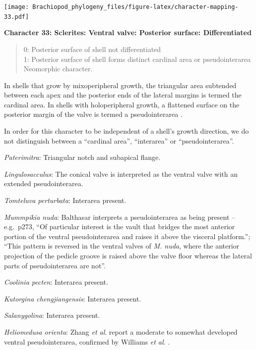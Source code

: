 \documentclass[]{book}
\theoremstyle{definition}
\theoremstyle{definition}
\theoremstyle{definition}
\theoremstyle{remark}
\begin{document}
\texttt{[image: Brachiopod\_phylogeny\_files/figure-latex/character-mapping-33.pdf]}

\textbf{Character 33: Sclerites: Ventral valve: Posterior surface:
Differentiated}

\begin{quote}
0: Posterior surface of shell not differentiated\\
1: Posterior surface of shell forms distinct cardinal area or
pseudointerarea\\
Neomorphic character.
\end{quote}

In shells that grow by mixoperipheral growth, the triangular area
subtended between each apex and the posterior ends of the lateral
margins is termed the cardinal area. In shells with holoperipheral
growth, a flattened surface on the posterior margin of the valve is
termed a pseudointerarea
\citep[paraphrasing][]{Williams1997BrachiopodaRevised}.

In order for this character to be independent of a shell's growth
direction, we do not distinguish between a ``cardinal area'',
``interarea'' or ``pseudointerarea''.

\emph{Paterimitra}: Triangular notch and subapical flange.

\emph{Lingulosacculus}: The conical valve is interpreted as the ventral
valve with an extended pseudointerarea.

\emph{Tomteluva perturbata}: Interarea present.

\emph{Mummpikia nuda}: Balthasar \citeyearpar{Balthasar2008iMummpikia}
interprets a pseudointerarea as being present -- e.g.~p273, ``Of
particular interest is the vault that bridges the most anterior portion
of the ventral pseudointerarea and raises it above the visceral
platform.''; ``This pattern is reversed in the ventral valves of
\emph{M. nuda}, where the anterior projection of the pedicle groove is
raised above the valve floor whereas the lateral parts of
pseudointerarea are not''.

\emph{Coolinia pecten}: Interarea present.

\emph{Kutorgina chengjiangensis}: Interarea present.

\emph{Salanygolina}: Interarea present.

\emph{Heliomedusa orienta}: Zhang \emph{et al}.
\citeyearpar{Zhang2009Architectureand} report a moderate to somewhat
developed ventral pseudointerarea, confirmed by Williams \emph{et al}.
\citeyearpar{Williams2007PartH}.
\end{document}

